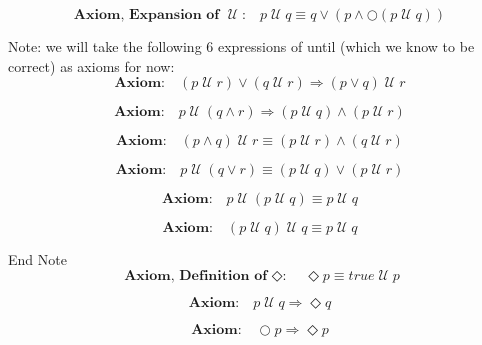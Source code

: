 \documentclass[fleqn, leqno]{article}
\newcommand{\until}{\;\mathcal{U}\;}
\begin{document}
\begin{equation}\label{E:expansionUntil}
\textbf{Axiom, Expansion of $\until$:}\quad p \until q \equiv q \lor (p \land \bigcirc (p \until q))
\end{equation}

Note: we will take the following 6 expressions of until (which we know to be correct) as axioms for now:\\

\begin{equation}\label{E:untilOrImp}
\textbf{Axiom:}\quad (p \until r) \lor (q \until r) \Rightarrow (p \lor q) \until r
\end{equation}

\begin{equation}\label{E:untilAndImp}
\textbf{Axiom:}\quad p \until (q \land r) \Rightarrow (p \until q) \land (p \until r)
\end{equation}

\begin{equation}\label{E:untilAndEquiv}
\textbf{Axiom:}\quad (p \land q) \until r \equiv (p \until r) \land (q \until r)
\end{equation}

\begin{equation}\label{E:untilOrEquiv}
\textbf{Axiom:}\quad p \until (q \lor r) \equiv (p \until q) \lor (p \until r)
\end{equation}

\begin{equation}\label{E:untilIdem}
\textbf{Axiom:}\quad p \until (p \until q) \equiv p \until q
\end{equation}

\begin{equation}\label{E:untilIdemR}
\textbf{Axiom:}\quad (p \until q) \until q \equiv p \until q
\end{equation}

End Note\\

\begin{equation}\label{E:defEvent}
\textbf{Axiom, Definition of $\Diamond$:}\quad \Diamond p \equiv true \until p
\end{equation}

\begin{equation}\label{E:untilImpEvent}
\textbf{Axiom:}\quad p \until q \Rightarrow \Diamond q
\end{equation}

\begin{equation}\label{E:nextEvent}
\textbf{Axiom:}\quad \bigcirc p \Rightarrow \Diamond p
\end{equation}
\end{document}
